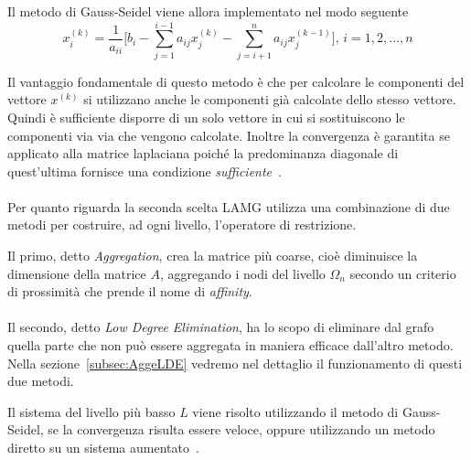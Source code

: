 Il metodo di Gauss-Seidel viene allora implementato nel modo seguente
\begin{equation}
x_i^{(k)} = \frac{1}{a_{ii}} \bigg[b_i - \sum_{j=1}^{i-1} a_{ij}x_j^{(k)} - \sum_{j=i+1}^{n} a_{ij}x_j^{(k-1)} \bigg],\, i=1,2,\dots,n
\end{equation}

Il vantaggio fondamentale di questo metodo è che per calcolare le componenti del vettore $x^{(k)}$ si utilizzano anche le componenti già calcolate dello stesso vettore. Quindi è sufficiente disporre di un solo vettore in cui si sostituiscono le componenti via via che vengono calcolate.
Inoltre la convergenza è garantita se applicato alla matrice laplaciana poiché la predominanza diagonale di quest'ultima fornisce una condizione \emph{sufficiente}~\cite[110]{Toporagno}.\\
\\
Per quanto riguarda la seconda scelta LAMG utilizza una combinazione di due metodi per costruire, ad ogni livello, l'operatore di restrizione.

Il primo, detto \emph{Aggregation}, crea la matrice più coarse, cioè diminuisce la dimensione della matrice $A$, aggregando i nodi del livello $\Omega_n$ secondo un criterio di prossimità che prende il nome di \emph{affinity}.\\
\\
Il secondo, detto \emph{Low Degree Elimination}, ha lo scopo di eliminare dal grafo quella parte che non può essere aggregata in maniera efficace dall'altro metodo.
Nella sezione~\vref{subsec:AggeLDE} vedremo nel dettaglio il funzionamento di questi due metodi.

Il sistema del livello più basso $L$ viene risolto utilizzando il metodo di Gauss-Seidel, se la convergenza risulta essere veloce, oppure utilizzando un metodo diretto su un sistema aumentato~\cite{lamg_Report}.

\label{subsec:AggeLDE}

